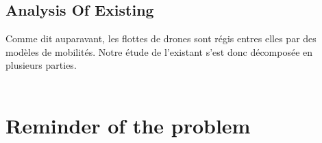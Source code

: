 \section{Analysis Of Existing}

Comme dit auparavant, les flottes de drones sont régis entres elles par des modèles de mobilités. Notre étude de l'existant s'est donc décomposée en plusieurs parties.\\\\

\chapter{Reminder of the problem}
